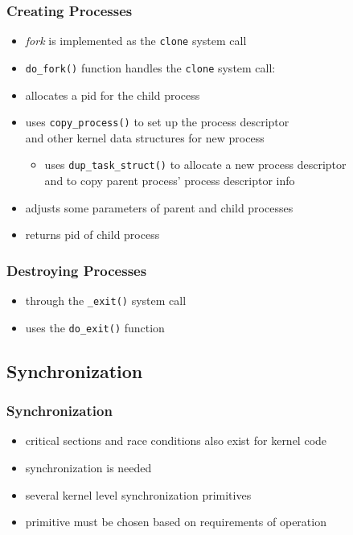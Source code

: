 \documentclass[dvipsnames]{beamer}
\begin{document}
\begin{frame}
  \frametitle{Creating Processes}

  \begin{itemize}
    \item \textit{fork} is implemented as the \lstinline|clone| system call
    \item \lstinline|do_fork()| function handles the \lstinline|clone|
      system call:

    \medskip
    \item allocates a pid for the child process
    \item uses \lstinline|copy_process()| to set up the process descriptor\\
      and other kernel data structures for new process
    \begin{itemize}
      \item uses \lstinline|dup_task_struct()| to allocate a new process
        descriptor\\
        and to copy parent process' process descriptor info
    \end{itemize}
    \item adjusts some parameters of parent and child processes
    \item returns pid of child process
  \end{itemize}
\end{frame}

\begin{frame}
  \frametitle{Destroying Processes}

  \begin{itemize}
    \item through the \lstinline|_exit()| system call
    \item uses the \lstinline|do_exit()| function
  \end{itemize}
\end{frame}

\subsection{Synchronization}

\begin{frame}
  \frametitle{Synchronization}

  \begin{itemize}
    \item critical sections and race conditions also exist for kernel code
    \item synchronization is needed

    \bigskip
    \item several kernel level synchronization primitives
    \item primitive must be chosen based on requirements of operation
  \end{itemize}
\end{frame}
\end{document}
